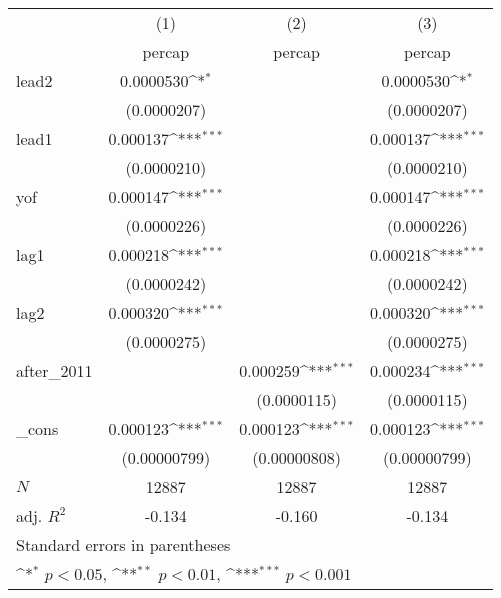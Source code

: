 {
\def\sym#1{\ifmmode^{#1}\else\(^{#1}\)\fi}
\begin{tabular}{l*{3}{c}}
\hline\hline
            &\multicolumn{1}{c}{(1)}&\multicolumn{1}{c}{(2)}&\multicolumn{1}{c}{(3)}\\
            &\multicolumn{1}{c}{percap}&\multicolumn{1}{c}{percap}&\multicolumn{1}{c}{percap}\\
\hline
lead2       &   0.0000530\sym{*}  &                     &   0.0000530\sym{*}  \\
            & (0.0000207)         &                     & (0.0000207)         \\
[1em]
lead1       &    0.000137\sym{***}&                     &    0.000137\sym{***}\\
            & (0.0000210)         &                     & (0.0000210)         \\
[1em]
yof         &    0.000147\sym{***}&                     &    0.000147\sym{***}\\
            & (0.0000226)         &                     & (0.0000226)         \\
[1em]
lag1        &    0.000218\sym{***}&                     &    0.000218\sym{***}\\
            & (0.0000242)         &                     & (0.0000242)         \\
[1em]
lag2        &    0.000320\sym{***}&                     &    0.000320\sym{***}\\
            & (0.0000275)         &                     & (0.0000275)         \\
[1em]
after\_2011  &                     &    0.000259\sym{***}&    0.000234\sym{***}\\
            &                     & (0.0000115)         & (0.0000115)         \\
[1em]
\_cons      &    0.000123\sym{***}&    0.000123\sym{***}&    0.000123\sym{***}\\
            &(0.00000799)         &(0.00000808)         &(0.00000799)         \\
\hline
\(N\)       &       12887         &       12887         &       12887         \\
adj. \(R^{2}\)&      -0.134         &      -0.160         &      -0.134         \\
\hline\hline
\multicolumn{4}{l}{\footnotesize Standard errors in parentheses}\\
\multicolumn{4}{l}{\footnotesize \sym{*} \(p<0.05\), \sym{**} \(p<0.01\), \sym{***} \(p<0.001\)}\\
\end{tabular}
}
